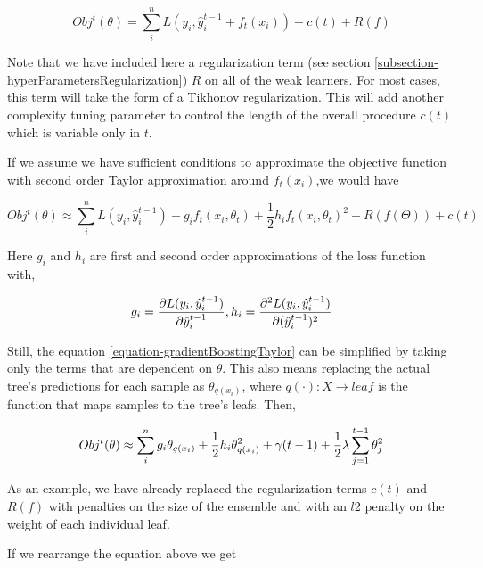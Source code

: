 \begin{equation}
Obj^t(\theta) =  \sum_i^n L(y_i, \hat{y}^{t-1}_i +  f_t(x_i) ) + c(t) + R(f)
\end{equation}


Note that we have included here a regularization term (see section \ref{subsection-hyperParametersRegularization}) $R$ on all of the weak learners. For most cases,  this term will take the form of a Tikhonov regularization. This will add another complexity tuning parameter to control the length of the overall procedure $c(t)$ which is variable only in $t$.

If we assume we have sufficient conditions to approximate the objective function with second order Taylor approximation around $f_t(x_i)$,we would have

\begin{equation}\label{equation-gradientBoostingTaylor}
Obj^t(\theta) \approx \sum_i^n {L(y_i, \hat{y}^{t-1}_i) + g_i f_t(x_i,\theta_t) + \frac{1}{2} h_i f_t(x_i,\theta_t)^2 } +  R(f(\Theta)) +  c(t)
\end{equation}

Here $g_i$ and $h_i$ are first and second order approximations of the loss function with,

\[
g_i =  \frac{\partial L(y_i, \hat{y}^{t-1}_i)}{\partial \hat{y}^{t-1}_i}, \  \\
h_i =  \frac{\partial^2 L(y_i, \hat{y}^{t-1}_i)}{\partial (\hat{y}^{t-1}_i)^2 }
\]

Still, the equation \ref{equation-gradientBoostingTaylor} can be simplified by taking only the terms that are dependent on $\theta$. This also means replacing the actual tree's predictions for each sample as $\theta_{q(x_i)}$, where $q(\cdot): X \rightarrow leaf$ is the function that maps samples to the tree's leafs. Then,


\begin{equation} \label{eq:gb-objSteps1}
Obj^t(\theta) \approx  \sum_i^n {g_i \theta_{q(x_i)} + \frac{1}{2} h_i \theta_{q(x_i)}^2 } + \gamma ({t-1}) + \frac{1}{2}\lambda \sum_{j=1}^{t-1} \theta_j^2 \\
\end{equation}

As an example, we have already replaced the regularization terms $c(t)$ and $R(f)$ with penalties on the size of the ensemble and with an $l$2 penalty on the weight of each individual leaf.

If we rearrange the equation above we get

